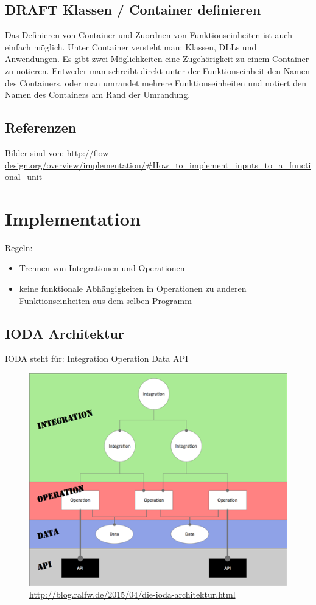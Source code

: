 \documentclass[a4paper,12pt,oneside]{book}
\begin{document}
\section{DRAFT Klassen / Container definieren}
\label{sec-3-12}
Das Definieren von Container und Zuordnen von Funktionseinheiten ist auch
einfach möglich. Unter Container versteht man: Klassen, DLLs und Anwendungen.
Es gibt zwei Möglichkeiten eine Zugehörigkeit zu einem Container zu notieren.
Entweder man schreibt direkt unter der Funktionseinheit den Namen des
Containers, oder man umrandet mehrere Funktionseinheiten und notiert den Namen
des Containers am Rand der Umrandung.
\section{Referenzen}
\label{sec-3-13}
Bilder sind von:
\url{http://flow-design.org/overview/implementation/#How_to_implement_inputs_to_a_functional_unit}

\chapter{Implementation}
\label{sec-4}

Regeln:
\begin{itemize}
\item Trennen von Integrationen und Operationen
\item keine funktionale Abhängigkeiten in Operationen zu anderen Funktionseinheiten aus dem selben Programm
\end{itemize}
\section{IODA Architektur}
\label{sec-4-1}
IODA steht für: Integration Operation Data API
\begin{figure}[htb]
\centering
\includegraphics[width=.9\linewidth]{./img/ioda1.png}
\caption{\url{http://blog.ralfw.de/2015/04/die-ioda-architektur.html}}
\end{figure}
\end{document}
